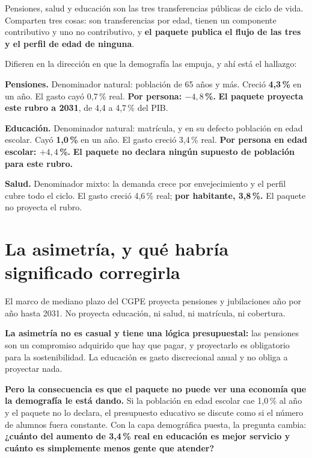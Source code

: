Pensiones, salud y educación son las tres transferencias públicas de ciclo de vida. Comparten
tres cosas: son transferencias por edad, tienen un componente contributivo y uno no
contributivo, y \textbf{el paquete publica el flujo de las tres y el perfil de edad de
ninguna}.

Difieren en la dirección en que la demografía las empuja, y ahí está el hallazgo:

\begin{list}{}{\setlength{\leftmargin}{1.4em}\setlength{\itemsep}{3pt}}
\item[$\bullet$] \textbf{Pensiones.} Denominador natural: población de 65 años y más. Creció
\textbf{4,3\,\%} en un año. El gasto cayó 0,7\,\% real. \textbf{Por persona: $-4,8$\,\%.}
\textbf{El paquete proyecta este rubro a 2031}, de 4,4 a 4,7\,\% del PIB.
\item[$\bullet$] \textbf{Educación.} Denominador natural: matrícula, y en su defecto población
en edad escolar. Cayó \textbf{1,0\,\%} en un año. El gasto creció 3,4\,\% real. \textbf{Por
persona en edad escolar: $+4,4$\,\%.} \textbf{El paquete no declara ningún supuesto de
población para este rubro.}
\item[$\bullet$] \textbf{Salud.} Denominador mixto: la demanda crece por envejecimiento y el
perfil cubre todo el ciclo. El gasto creció 4,6\,\% real; \textbf{por habitante, 3,8\,\%.}
El paquete no proyecta el rubro.
\end{list}

\section{La asimetría, y qué habría significado corregirla}

El marco de mediano plazo del CGPE proyecta pensiones y jubilaciones año por año hasta 2031.
No proyecta educación, ni salud, ni matrícula, ni cobertura.

\textbf{La asimetría no es casual y tiene una lógica presupuestal:} las pensiones son un
compromiso adquirido que hay que pagar, y proyectarlo es obligatorio para la sostenibilidad.
La educación es gasto discrecional anual y no obliga a proyectar nada.

\textbf{Pero la consecuencia es que el paquete no puede ver una economía que la demografía le
está dando.} Si la población en edad escolar cae 1,0\,\% al año y el paquete no lo declara, el
presupuesto educativo se discute como si el número de alumnos fuera constante. Con la capa
demográfica puesta, la pregunta cambia: \textbf{¿cuánto del aumento de 3,4\,\% real en
educación es mejor servicio y cuánto es simplemente menos gente que atender?}

